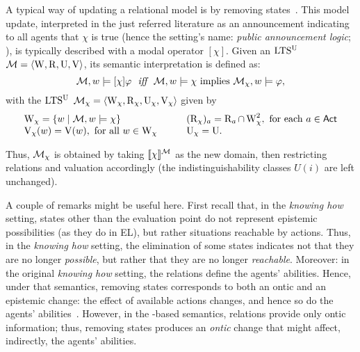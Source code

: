 

A typical way of updating a relational model is by removing states~\cite{Plaza89:lopc,DELbook}. This model update, interpreted in the just referred literature as an announcement indicating to all agents that $\chi$ is true (hence the setting's name: \emph{public announcement logic}; \PAL), is typically described with a modal operator $[\chi]$. Given an $\textup{LTS$^\text{\textup{U}}$}$ $\mathcal{M}=\langle \operatorname{W},\operatorname{R},\operatorname{U},\operatorname{V} \rangle$, its semantic interpretation is defined as:
\[
\modults,w\models[\chi]\varphi \ \ \iff \ \  \modults,w\models\chi \mbox{ implies } \modults_{\chi},w\models\varphi,
\]
with the $\textup{LTS$^\text{\textup{U}}$}$ $\mathcal{M}_\chi=\langle \operatorname{W}_\chi,\operatorname{R}_\chi,\operatorname{U}_\chi,\operatorname{V}_\chi \rangle$ given by
\[
\begin{array}{l@{\quad \quad \quad }l}
\W_\chi = \set{w \mid \modults,w\models\chi} & (\R_\chi)_a = \R_a \cap \W_\chi^2, \mbox{ for each } a\in\ACT \\
\V_\chi(w) = \V(w), \mbox{ for all } w\in\W_\chi & \Unc_\chi = {\Unc}.
\end{array}	
\]

Thus, $\mathcal{M}_\chi$ is obtained by taking $\llbracket \chi \rrbracket^{\mathcal{M}}$ as the new domain, then restricting relations and valuation accordingly (the indistinguishability classes $U(i)$ are left unchanged). 

\smallskip

A couple of remarks might be useful here. First recall that, in the \emph{knowing how} setting, states other than the evaluation point do not represent epistemic possibilities (as they do in EL), but rather situations reachable by actions. Thus, in the \emph{knowing how} setting, the elimination of some states indicates not that they are no longer \emph{possible}, but rather that they are no longer \emph{reachable}. Moreover: in the original \emph{knowing how} setting, the relations define the agents' abilities. Hence, under that semantics, removing states corresponds to both an ontic and an epistemic change: the effect of available actions changes, and hence so do the agents' abilities~\cite{Wang2016}. However, in the \ults-based semantics, relations provide only ontic information; thus, removing states produces an \emph{ontic} change that might affect, indirectly, the agents' abilities.


